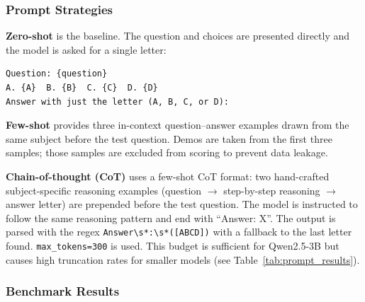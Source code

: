 \documentclass[12pt, a4paper]{article}
\begin{document}
\subsubsection{Prompt Strategies}

\textbf{Zero-shot} is the baseline. The question and choices are presented directly and the model is asked for a single letter:
\begin{lstlisting}
Question: {question}
A. {A}  B. {B}  C. {C}  D. {D}
Answer with just the letter (A, B, C, or D):
\end{lstlisting}

\textbf{Few-shot} provides three in-context question--answer examples drawn from the same subject before the test question. Demos are taken from the first three samples; those samples are excluded from scoring to prevent data leakage.

\textbf{Chain-of-thought (CoT)} uses a few-shot CoT format: two hand-crafted subject-specific reasoning examples (question $\to$ step-by-step reasoning $\to$ answer letter) are prepended before the test question. The model is instructed to follow the same reasoning pattern and end with ``Answer: X''. The output is parsed with the regex \texttt{Answer\textbackslash{}s*:\textbackslash{}s*([ABCD])} with a fallback to the last letter found. \texttt{max\_tokens=300} is used. This budget is sufficient for Qwen2.5-3B but causes high truncation rates for smaller models (see Table~\ref{tab:prompt_results}).



\subsubsection{Benchmark Results}
\end{document}
